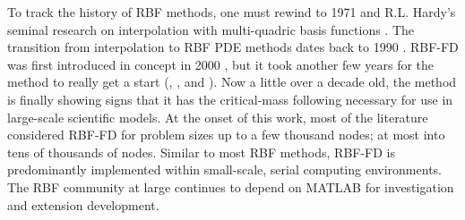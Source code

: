 \documentclass[11pt]{report}
\begin{document}




To track the history of RBF methods, one must rewind to 1971 and R.L. Hardy's seminal research on interpolation with multi-quadric basis functions \cite{Hardy1971}. The transition from interpolation to RBF PDE methods dates back to 1990 \cite{Kansa1990a,Kansa1990b}. 
RBF-FD was first introduced in concept in 2000 \cite{Tolstykh2000}, but it took another few years for the method to really get a start (\cite{Shu2003}, \cite{Tolstykh2003a}, \cite{Wright2003} and \cite{Cecil2004}). Now a little over a decade old, the method is finally showing signs that it has the critical-mass following necessary for use in large-scale scientific models. At the onset of this work, most of the literature considered RBF-FD for problem sizes up to a few thousand nodes; at most into tens of thousands of nodes. Similar to most RBF methods, RBF-FD is predominantly implemented within small-scale, serial computing environments. The RBF community at large continues to depend on MATLAB for investigation and extension development.
\end{document}
